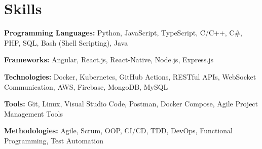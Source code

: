 \section{Skills}
\vspace{2pt}
\resumeSubHeadingListStart
\small{\item{

              \textbf{Programming Languages:}{ Python, JavaScript, TypeScript, C/C++, C\#, PHP, SQL, Bash (Shell Scripting), Java} \\ \vspace{3pt}

              \textbf{Frameworks:}{ Angular, React.js, React-Native, Node.js, Express.js} \\ \vspace{3pt}

              \textbf{Technologies:}{ Docker, Kubernetes, GitHub Actions, RESTful APIs, WebSocket Communication, AWS, Firebase, MongoDB, MySQL} \\ \vspace{3pt}

              \textbf{Tools:}{ Git, Linux, Visual Studio Code, Postman, Docker Compose, Agile Project Management Tools} \\ \vspace{3pt}

              \textbf{Methodologies:}{ Agile, Scrum, OOP, CI/CD, TDD, DevOps, Functional Programming, Test Automation} \\ \vspace{3pt}

        }}
\resumeSubHeadingListEnd
